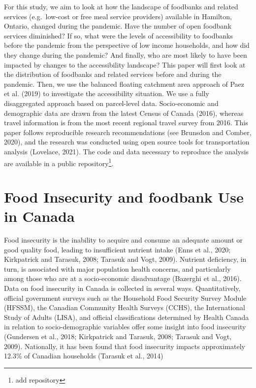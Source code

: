 \documentclass[]{elsarticle} %
\begin{document}
For this study, we aim to look at how the landscape of foodbanks and
related services (e.g.~low-cost or free meal service providers)
available in Hamilton, Ontario, changed during the pandemic. Have the
number of open foodbank services diminished? If so, what were the levels
of accessibility to foodbanks before the pandemic from the perspective
of low income households, and how did they change during the pandemic?
And finally, who are most likely to have been impacted by changes to the
accessibility landscape? This paper will first look at the distribution
of foodbanks and related services before and during the pandemic. Then,
we use the balanced floating catchment area approach of Paez et al.
(2019) to investigate the accessibility situation. We use a fully
disaggregated approach based on parcel-level data. Socio-economic and
demographic data are drawn from the latest Census of Canada (2016),
whereas travel information is from the most recent regional travel
survey from 2016. This paper follows reproducible research
recommendations (see Brunsdon and Comber, 2020), and the research was
conducted using open source tools for transportation analysis (Lovelace,
2021). The code and data necessary to reproduce the analysis are
available in a public repository\footnote{add repository}.

\hypertarget{food-insecurity-and-foodbank-use-in-canada}{%
\section{Food Insecurity and foodbank Use in
Canada}\label{food-insecurity-and-foodbank-use-in-canada}}

Food insecurity is the inability to acquire and consume an adequate
amount or good quality food, leading to insufficient nutrient intake
(Enns et al., 2020; Kirkpatrick and Tarasuk, 2008; Tarasuk and Vogt,
2009). Nutrient deficiency, in turn, is associated with major population
health concerns, and particularly among those who are at a
socio-economic disadvantage (Bazerghi et al., 2016). Data on food
insecurity in Canada is collected in several ways. Quantitatively,
official government surveys such as the Household Food Security Survey
Module (HFSSM), the Canadian Community Health Surveys (CCHS), the
International Study of Adults (LISA), and official classifications
determined by Health Canada in relation to socio-demographic variables
offer some insight into food insecurity (Gundersen et al., 2018;
Kirkpatrick and Tarasuk, 2008; Tarasuk and Vogt, 2009). Nationally, it
has been found that food insecurity impacts approximately 12.3\% of
Canadian households (Tarasuk et al., 2014)
\end{document}
